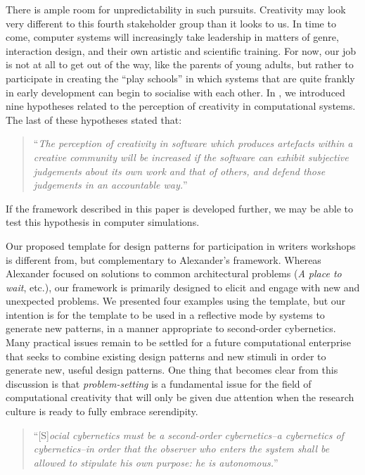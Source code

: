 There is ample room for unpredictability in such pursuits.  Creativity
may look very different to this fourth stakeholder group than it looks
to us.  In time to come, computer systems will increasingly take
leadership in matters of genre, interaction design, and their own
artistic and scientific training.  For now, our job is not at all to
get out of the way, like the parents of young adults, but rather to
participate in creating the ``play schools'' in which systems that are
quite frankly in early development can begin to socialise with each
other.
%
In \cite{stakeholder-groups-bookchapter}, we introduced nine
hypotheses related to the perception of creativity in computational
systems. 
The last of these hypotheses stated that:
\begin{quote}
``\emph{The perception of creativity in software which produces
  artefacts within a creative community will be increased if the
  software can exhibit subjective judgements about its own work and
  that of others, and defend those judgements in an accountable
  way.}''~\cite{stakeholder-groups-bookchapter}
\end{quote}
If the framework described in this paper is developed further, we may
be able to test this hypothesis in computer simulations.

Our proposed template for design patterns for participation in writers
workshops is different from, but complementary to Alexander's
framework.  Whereas Alexander focused on solutions to common
architectural problems (\emph{A place to wait}, etc.), our framework
is primarily designed to elicit and engage with new and unexpected
problems.  We presented four examples using the template, but our
intention is for the template to be used in a reflective mode by
systems to generate new patterns, in a manner appropriate to
second-order cybernetics.  Many practical issues remain to be settled
for a future computational enterprise that seeks to combine existing
design patterns and new stimuli in order to generate new, useful
design patterns.  One thing that becomes clear from this discussion is
that \emph{problem-setting} is a fundamental issue for the field of
computational creativity that will only be given due attention when
the research culture is ready to fully embrace serendipity.

\begin{quote}
``[S]\emph{ocial cybernetics must be a second-order cybernetics--a
    cybernetics of cybernetics--in order that the observer who enters
    the system shall be allowed to stipulate his own purpose: he is
    autonomous.}'' \cite[p. 286]{von2003essays}
\end{quote}

